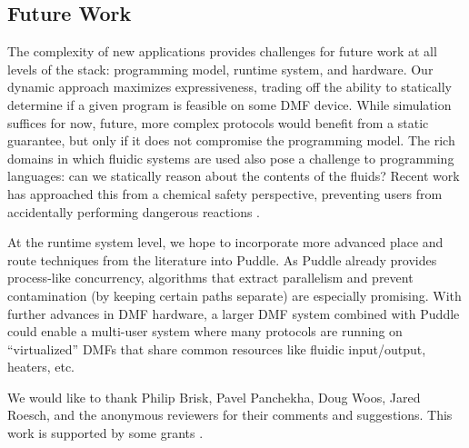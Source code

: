 \documentclass[sigconf, screen]{acmart}
\begin{document}
\subsection{Future Work}
\label{sec:future}

The complexity of new applications provides challenges for future work at all levels of the stack: programming model, runtime system, and hardware.
Our dynamic approach maximizes expressiveness, trading off the ability to statically determine if a given program is feasible on some DMF device.
While simulation suffices for now, future, more complex protocols would benefit from a static guarantee, but only if it does not compromise the programming model.
The rich domains in which fluidic systems are used also pose a challenge to programming languages: can we statically reason about the contents of the fluids?
Recent work has approached this from a chemical safety perspective, preventing users from accidentally performing dangerous reactions \cite{ott2018bioscript}.

At the runtime system level, we hope to incorporate more advanced place and route techniques from the literature into Puddle.
As Puddle already provides process-like concurrency, algorithms that extract parallelism and prevent contamination (by keeping certain paths separate) are especially promising.
With further advances in DMF hardware, a larger DMF system combined with Puddle could enable a multi-user system where many protocols are running on ``virtualized'' DMFs that share common resources like fluidic input/output, heaters, etc.

\begin{acks}
  We would like to thank Philip Brisk, Pavel Panchekha, Doug Woos, Jared Roesch, and the anonymous reviewers for their comments and suggestions.
  This work is supported by some grants .
\end{acks}



\end{document}
